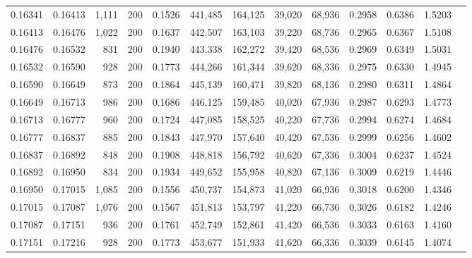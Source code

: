 \begin{tabular}{rrrrrrrrrrrrr}
0.16341 & 0.16413 &  1,111 & 200 &                                     0.1526 & 441,485 & 164,125 &  39,020 &  68,936 & 0.2958 & 0.6386 & 1.5203 \\
0.16413 & 0.16476 &  1,022 & 200 &                                     0.1637 & 442,507 & 163,103 &  39,220 &  68,736 & 0.2965 & 0.6367 & 1.5108 \\
0.16476 & 0.16532 &    831 & 200 &                                     0.1940 & 443,338 & 162,272 &  39,420 &  68,536 & 0.2969 & 0.6349 & 1.5031 \\
0.16532 & 0.16590 &    928 & 200 &                                     0.1773 & 444,266 & 161,344 &  39,620 &  68,336 & 0.2975 & 0.6330 & 1.4945 \\
0.16590 & 0.16649 &    873 & 200 &                                     0.1864 & 445,139 & 160,471 &  39,820 &  68,136 & 0.2980 & 0.6311 & 1.4864 \\
0.16649 & 0.16713 &    986 & 200 &                                     0.1686 & 446,125 & 159,485 &  40,020 &  67,936 & 0.2987 & 0.6293 & 1.4773 \\
0.16713 & 0.16777 &    960 & 200 &                                     0.1724 & 447,085 & 158,525 &  40,220 &  67,736 & 0.2994 & 0.6274 & 1.4684 \\
0.16777 & 0.16837 &    885 & 200 &                                     0.1843 & 447,970 & 157,640 &  40,420 &  67,536 & 0.2999 & 0.6256 & 1.4602 \\
0.16837 & 0.16892 &    848 & 200 &                                     0.1908 & 448,818 & 156,792 &  40,620 &  67,336 & 0.3004 & 0.6237 & 1.4524 \\
0.16892 & 0.16950 &    834 & 200 &                                     0.1934 & 449,652 & 155,958 &  40,820 &  67,136 & 0.3009 & 0.6219 & 1.4446 \\
0.16950 & 0.17015 &  1,085 & 200 &                                     0.1556 & 450,737 & 154,873 &  41,020 &  66,936 & 0.3018 & 0.6200 & 1.4346 \\
0.17015 & 0.17087 &  1,076 & 200 &                                     0.1567 & 451,813 & 153,797 &  41,220 &  66,736 & 0.3026 & 0.6182 & 1.4246 \\
0.17087 & 0.17151 &    936 & 200 &                                     0.1761 & 452,749 & 152,861 &  41,420 &  66,536 & 0.3033 & 0.6163 & 1.4160 \\
0.17151 & 0.17216 &    928 & 200 &                                     0.1773 & 453,677 & 151,933 &  41,620 &  66,336 & 0.3039 & 0.6145 & 1.4074 \\

\end{tabular}
